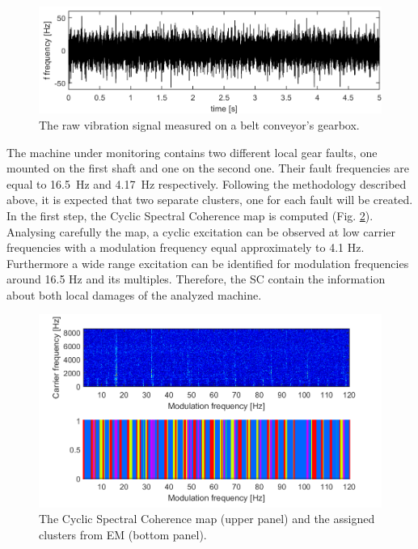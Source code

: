 \documentclass[11pt]{article}
\begin{document}
\begin{figure}[h!]
\begin{center}
\includegraphics[width=\textwidth]{wykresy/_sygnal.png}
\caption{The raw vibration signal measured on a belt conveyor's gearbox.}
\label{fig:raw_signal}
\end{center}
\end{figure}
The machine under monitoring contains two different local gear faults, one mounted on the first shaft and one on the second one. Their fault frequencies are equal to 16.5~Hz and 4.17~Hz respectively. Following the methodology described above, it is expected that two separate clusters, one for each fault will be created. In the first step, the Cyclic Spectral Coherence map is computed (Fig. \ref{fig:SC}). Analysing carefully the map, a cyclic excitation can be observed at low carrier frequencies with a modulation frequency equal approximately to 4.1 Hz. Furthermore a wide range excitation can be identified for modulation frequencies around 16.5 Hz and its multiples. Therefore, the SC contain the information about both local damages of the analyzed machine.
%
\begin{figure}[h!]
\begin{center}
\includegraphics[width=\textwidth]{wykresy/212_SC_clusters.png}
\caption{The Cyclic Spectral Coherence map (upper panel) and the assigned clusters from EM (bottom panel).}
\label{fig:SC}
\end{center}
\end{figure}
\end{document}
